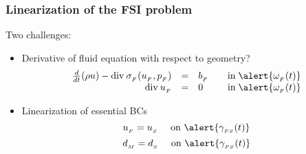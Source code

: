 \begin{frame}
  \frametitle{Linearization of the FSI problem}
  
  Two challenges:
  \begin{itemize}
  \item<2->
    Derivative of fluid equation with respect to geometry?
      \begin{equation*}
      \begin{array}{rlll}
        \ddt (\rho u) - \divsigmaFup & = & \fF &\quad \textrm{in}\;
       \alert{\oFt}\\
        \divuF & =& 0 &\quad  \textrm{in}\; \alert{\oFt}
      \end{array}
    \end{equation*}
  \item<3->
  Linearization of essential BCs
  \begin{equation*} 
    \uF = \uS
    \quad \text{ on } \alert{\gammaFS}
   \end{equation*}
  \begin{equation*}
    \dM = \dStruc
    \quad \text{ on } \alert{\gammaFS}
  \end{equation*}
  \end{itemize}
\end{frame}
